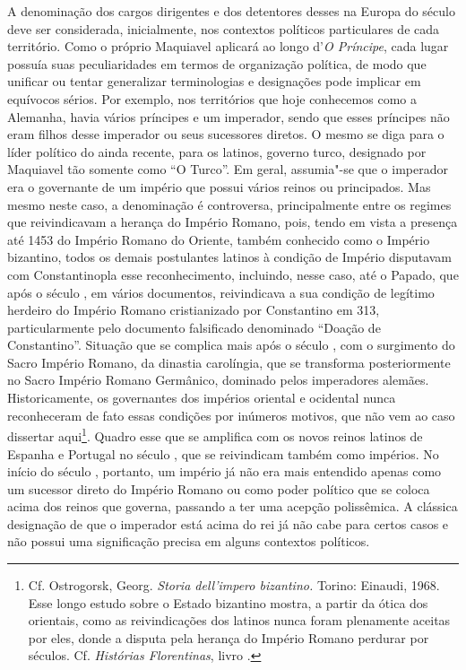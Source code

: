 A denominação dos cargos dirigentes e dos detentores desses na Europa do
século  deve ser considerada, inicialmente, nos contextos políticos
particulares de cada território. Como o próprio Maquiavel aplicará ao
longo d'\emph{O Príncipe}, cada lugar possuía suas peculiaridades
em termos de organização política, de modo que unificar ou tentar
generalizar terminologias e designações pode implicar em equívocos
sérios. Por exemplo, nos territórios que hoje conhecemos como a
Alemanha, havia vários príncipes e um imperador, sendo que esses
príncipes não eram filhos desse imperador ou seus sucessores diretos. O
mesmo se diga para o líder político do ainda recente, para os latinos,
governo turco, designado por Maquiavel tão somente como ``O Turco''. Em
geral, assumia"-se que o imperador era o governante de um império que
possui vários reinos ou principados. Mas mesmo neste caso, a denominação
é controversa, principalmente entre os regimes que reivindicavam a
herança do Império Romano, pois, tendo em vista a presença até 1453 do
Império Romano do Oriente, também conhecido como o Império bizantino,
todos os demais postulantes latinos à condição de Império disputavam com
Constantinopla esse reconhecimento, incluindo, nesse caso, até o Papado,
que após o século , em vários documentos, reivindicava a sua
condição de legítimo herdeiro do Império Romano cristianizado por
Constantino em 313, particularmente pelo documento falsificado
denominado ``Doação de Constantino''. Situação que se complica mais após
o século , com o surgimento do Sacro Império Romano, da dinastia
carolíngia, que se transforma posteriormente no Sacro Império Romano
Germânico, dominado pelos imperadores alemães. Historicamente, os
governantes dos impérios oriental e ocidental nunca reconheceram de fato
essas condições por inúmeros motivos, que não vem ao caso dissertar
aqui\footnote{Cf. Ostrogorsk, Georg. \emph{Storia dell'impero
  bizantino.} Torino: Einaudi, 1968. Esse longo estudo sobre o Estado
  bizantino mostra, a partir da ótica dos orientais, como as
  reivindicações dos latinos nunca foram plenamente aceitas por eles,
  donde a disputa pela herança do Império Romano perdurar por
  séculos. Cf. \emph{Histórias Florentinas}, livro .}. Quadro esse que se amplifica com os novos reinos latinos de
Espanha e Portugal no século , que se reivindicam também como
impérios. No início do século , portanto, um império já não era mais
entendido apenas como um sucessor direto do Império Romano ou como poder
político que se coloca acima dos reinos que governa, passando a ter uma
acepção polissêmica. A clássica designação de que o imperador está acima
do rei já não cabe para certos casos e não possui uma significação
precisa em alguns contextos políticos.

